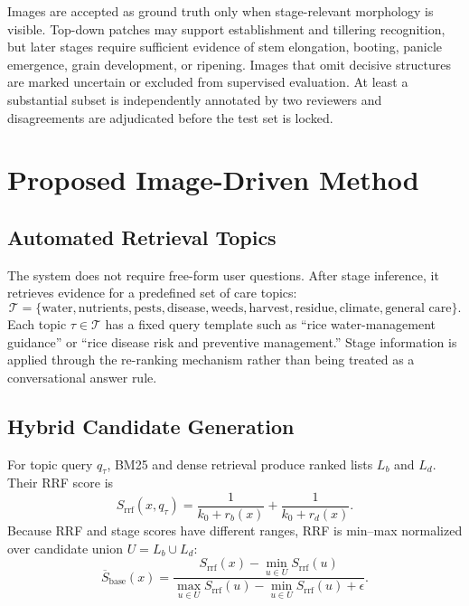 \documentclass[conference]{IEEEtran}
\begin{document}
Images are accepted as ground truth only when stage-relevant morphology is visible. Top-down patches may support establishment and tillering recognition, but later stages require sufficient evidence of stem elongation, booting, panicle emergence, grain development, or ripening. Images that omit decisive structures are marked uncertain or excluded from supervised evaluation. At least a substantial subset is independently annotated by two reviewers and disagreements are adjudicated before the test set is locked.

\section{Proposed Image-Driven Method}
\subsection{Automated Retrieval Topics}
The system does not require free-form user questions. After stage inference, it retrieves evidence for a predefined set of care topics:
\begin{equation}
\mathcal{T}=\{\text{water},\text{nutrients},\text{pests},\text{disease},\text{weeds},\text{harvest},\text{residue},\text{climate},\text{general care}\}.
\end{equation}
Each topic $\tau\in\mathcal{T}$ has a fixed query template such as ``rice water-management guidance'' or ``rice disease risk and preventive management.'' Stage information is applied through the re-ranking mechanism rather than being treated as a conversational answer rule.

\subsection{Hybrid Candidate Generation}
For topic query $q_{\tau}$, BM25 and dense retrieval produce ranked lists $L_b$ and $L_d$. Their RRF score is
\begin{equation}
S_{\mathrm{rrf}}(x,q_{\tau})=
\frac{1}{k_0+r_b(x)}+\frac{1}{k_0+r_d(x)}.
\end{equation}
Because RRF and stage scores have different ranges, RRF is min--max normalized over candidate union $U=L_b\cup L_d$:
\begin{equation}
\overline{S}_{\mathrm{base}}(x)=
\frac{S_{\mathrm{rrf}}(x)-\min_{u\in U}S_{\mathrm{rrf}}(u)}
{\max_{u\in U}S_{\mathrm{rrf}}(u)-\min_{u\in U}S_{\mathrm{rrf}}(u)+\epsilon}.
\end{equation}
\end{document}

